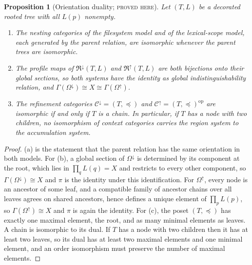 \documentclass[11pt]{article}
\newtheorem{proposition}[theorem]{Proposition}
\theoremstyle{definition}
\theoremstyle{remark}
\newcommand{\stN}{\textsc{proved here}}
\newcommand{\cC}{\mathcal C}
\newcommand{\fR}{\mathfrak R}
\newcommand{\op}{\mathrm{op}}
\begin{document}
\begin{proposition}[Orientation duality; \stN]\label{prop:orientation}
Let $(T,L)$ be a decorated rooted tree with all $L(p)$ nonempty.
\begin{enumerate}[label=(\alph*)]
\item The nesting categories of the filesystem model and of the lexical-scope model, each generated by the parent relation, are isomorphic whenever the parent trees are isomorphic.
\item The profile maps of $\fR^{\downarrow}(T,L)$ and $\fR^{\uparrow}(T,L)$ are both bijections onto their global sections, so both systems have the identity as global indistinguishability relation, and $\Gamma(\Omega^{\downarrow})\cong X\cong\Gamma(\Omega^{\uparrow})$.
\item The refinement categories $\cC^{\downarrow}=(T,\preceq)$ and $\cC^{\uparrow}=(T,\preceq)^{\op}$ are isomorphic if and only if $T$ is a chain. In particular, if $T$ has a node with two children, no isomorphism of context categories carries the region system to the accumulation system.
\end{enumerate}
\end{proposition}
\begin{proof}
(a) is the statement that the parent relation has the same orientation in both models. For (b), a global section of $\Omega^{\downarrow}$ is determined by its component at the root, which lies in $\prod_qL(q)=X$ and restricts to every other component, so $\Gamma(\Omega^{\downarrow})\cong X$ and $\pi$ is the identity under this identification. For $\Omega^{\uparrow}$, every node is an ancestor of some leaf, and a compatible family of ancestor chains over all leaves agrees on shared ancestors, hence defines a unique element of $\prod_pL(p)$, so $\Gamma(\Omega^{\uparrow})\cong X$ and $\pi$ is again the identity. For (c), the poset $(T,\preceq)$ has exactly one maximal element, the root, and as many minimal elements as leaves. A chain is isomorphic to its dual. If $T$ has a node with two children then it has at least two leaves, so its dual has at least two maximal elements and one minimal element, and an order isomorphism must preserve the number of maximal elements.
\end{proof}
\end{document}
